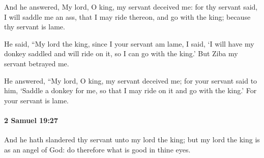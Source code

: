 			\begin{versebox}
					\item[BHS] 
					\item[ASV] And he answered, My lord, O king, my servant deceived me: for thy servant said, I will saddle me an ass, that I may ride thereon, and go with the king; because thy servant is lame.
					\item[NIV] He said, “My lord the king, since I your servant am lame, I said, ‘I will have my donkey saddled and will ride on it, so I can go with the king.’ But Ziba my servant betrayed me.
					\item[NRSV] He answered, “My lord, O king, my servant deceived me; for your servant said to him, ‘Saddle a donkey for me, so that I may ride on it and go with the king.’ For your servant is lame.
			\end{versebox}

		\paragraph{2 Samuel 19:27} %
			\label{2SAMUEL-19-27}

			And he hath slandered thy servant unto my lord the king; but my lord the king is as an angel of God: do therefore what is good in thine eyes.

